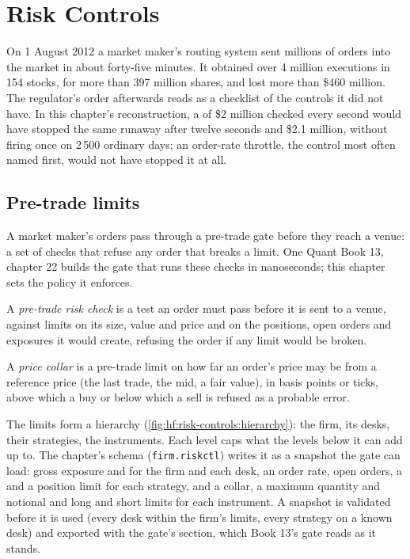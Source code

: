 \chapter{Risk Controls}\label{ch:hf:risk-controls}

On 1 August 2012 a market maker's routing system sent millions of orders into the market in about forty-five minutes. It obtained over 4
million executions in 154 stocks, for more than 397 million shares, and lost more than \$460 million. The regulator's order afterwards reads as a
checklist of the controls it did not have. In this chapter's reconstruction, a  of \$2 million checked every second would have stopped
the same runaway after twelve seconds and \$2.1 million, without firing once on 2\,500 ordinary days; an order-rate throttle, the control most
often named first, would not have stopped it at all.

\section{Pre-trade limits}

A market maker's orders pass through a pre-trade gate before they reach a venue: a set of checks that refuse any order that breaks a limit. One
Quant Book 13, chapter 22 builds the gate that runs these checks in nanoseconds; this chapter sets the policy it enforces.

\begin{definition}\label{def:hf:risk-controls:pretrade}
A \emph{pre-trade risk check} is a test an order must pass before it is sent to a venue, against limits on its size,
value and price and on the positions, open orders and exposures it would create, refusing the order if any limit would be broken.
\end{definition}

\begin{definition}\label{def:hf:risk-controls:collar}
A \emph{price collar} is a pre-trade limit on how far an order's price may be from a reference price (the last trade, the mid, a
fair value), in basis points or ticks, above which a buy or below which a sell is refused as a probable error.
\end{definition}

The limits form a hierarchy (\cref{fig:hf:risk-controls:hierarchy}): the firm, its desks, their strategies, the instruments. Each level caps what the
levels below it can add up to. The chapter's schema (\texttt{firm.riskctl}) writes it as a snapshot the gate can load: gross exposure and  for the firm and each desk, an order rate, open orders, a  and a position limit for each strategy, and a collar, a maximum quantity
and notional and long and short limits for each instrument. A snapshot is validated before it is used (every desk within the firm's limits, every
strategy on a known desk) and exported with the gate's section, which Book 13's gate reads as it stands.

